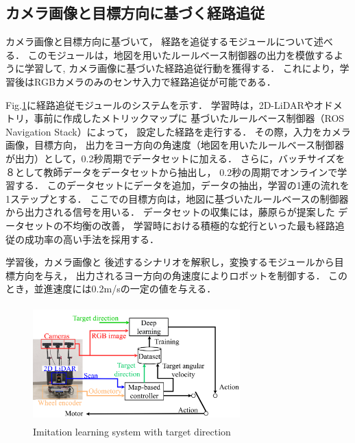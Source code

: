 \documentclass{sice-si}
\begin{document}



\subsection{カメラ画像と目標方向に基づく経路追従}
カメラ画像と目標方向に基づいて，
経路を追従するモジュールについて述べる．
このモジュールは，地図を用いたルールベース制御器の出力を模倣するように学習して,
カメラ画像に基づいた経路追従行動を獲得する\cite{haruyama2022}\cite{fujiwara2023}．
これにより，学習後はRGBカメラのみのセンサ入力で経路追従が可能である．
\par
Fig.\ref{fig:learning}に経路追従モジュールのシステムを示す．
学習時は，2D-LiDARやオドメトリ，事前に作成したメトリックマップに
基づいたルールベース制御器（ROS Navigation Stack\cite{ros-navigation}）によって，
設定した経路を走行する．
その際，入力をカメラ画像，目標方向，
出力をヨー方向の角速度（地図を用いたルールベース制御器が出力）として，0.2秒周期でデータセットに加える．
さらに，バッチサイズを８として教師データをデータセットから抽出し，
0.2秒の周期でオンラインで学習する．
このデータセットにデータを追加，データの抽出，学習の1連の流れを1ステップとする．
ここでの目標方向は，地図に基づいたルールベースの制御器から出力される信号を用いる．
データセットの収集には，藤原ら\cite{fujiwara2023}が提案した
データセットの不均衡の改善，
学習時における積極的な蛇行といった最も経路追従の成功率の高い手法を採用する．
\par
学習後，カメラ画像と
後述するシナリオを解釈し，変換するモジュールから目標方向を与え，
出力されるヨー方向の角速度によりロボットを制御する．
このとき，並進速度には0.2m/sの一定の値を与える．
\begin{figure}[htbp]
    \centering
     \includegraphics[height=45mm,width=80mm]{./figs/learning_gamma.png}
     \caption{Imitation learning system with target direction}\label{fig:learning}
\end{figure}
\end{document}
